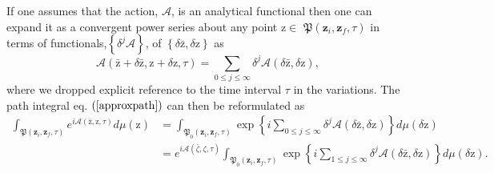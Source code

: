 \documentclass[aps,preprint]{revtex4}%
\begin{document}
If one assumes that the action, $\mathcal{A}$, is an analytical functional
then one can expand it as a convergent power series about any point
$\mathrm{z}\in$ $\mathfrak{P}\left(  \mathbf{z}_{i},\mathbf{z}_{f}%
,\tau\right)  $ in terms of functionals,$\left\{  \delta^{j}\mathcal{A}%
\right\}  $, of $\left\{  \delta\mathrm{\bar{z}},\delta\mathrm{z}\right\}  $
as
\begin{equation}
\mathcal{A}\left(  \mathrm{\bar{z}}+\delta\mathrm{\bar{z}},\mathrm{z}%
+\delta\mathrm{z}\mathbf{,}\tau\right)  =\sum\limits_{0\leq j\leq\infty}%
\delta^{j}\mathcal{A}\left(  \delta\mathrm{\bar{z}},\delta\mathrm{z}\right)  ,
\end{equation}
where we dropped explicit reference to the time interval $\tau$ in the
variations. The path integral eq. $\left(  \ref{approxpath}\right)  $ can then
be reformulated as%
\begin{align}
\int_{\mathfrak{P}\left(  \mathbf{z}_{i},\mathbf{z}_{f},\tau\right)
}e^{i\mathcal{A}\left(  \mathrm{\bar{z}},\mathrm{z}\mathbf{,}\tau\right)
}d\mu\left(  \mathrm{z}\right)   &  =\int_{\mathfrak{P}_{0}\left(
\mathbf{z}_{i},\mathbf{z}_{f},\tau\right)  }\exp\left\{  i\sum\limits_{0\leq
j\leq\infty}\delta^{j}\mathcal{A}\left(  \delta\mathrm{\bar{z}},\delta
\mathrm{z}\right)  \right\}  d\mu\left(  \delta\mathrm{z}\right) \nonumber\\
&  =e^{i\mathcal{A}\left(  \bar{\zeta}\mathbf{,}\zeta\mathbf{,}\tau\right)
}\int_{\mathfrak{P}_{0}\left(  \mathbf{z}_{i},\mathbf{z}_{f},\tau\right)
}\exp\left\{  i\sum\limits_{1\leq j\leq\infty}\delta^{j}\mathcal{A}\left(
\delta\mathrm{\bar{z}},\delta\mathrm{z}\right)  \right\}  d\mu\left(
\delta\mathrm{z}\right)  . \label{pathtay}%
\end{align}
\end{document}
